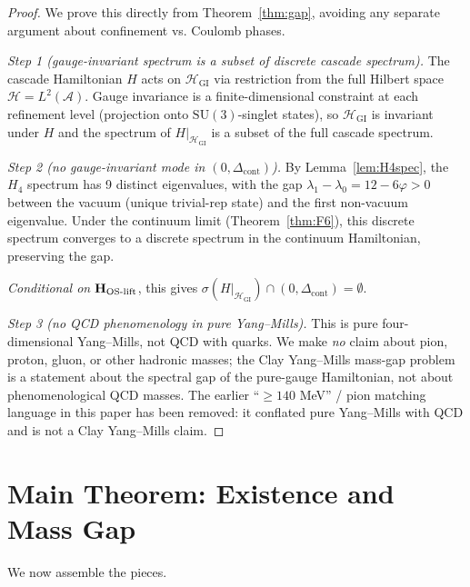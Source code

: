 \documentclass[11pt, a4paper]{amsart}
\theoremstyle{definition}
\newcommand{\HH}{\mathcal{H}}
\newcommand{\A}{\mathcal{A}}
\begin{document}
\begin{proof}
We prove this directly from Theorem~\ref{thm:gap}, avoiding any
separate argument about confinement vs. Coulomb phases.

\emph{Step 1 (gauge-invariant spectrum is a subset of discrete cascade
spectrum).} The cascade Hamiltonian $H$ acts on $\HH_{\mathrm{GI}}$
via restriction from the full Hilbert space $\HH = L^2(\A)$. Gauge
invariance is a finite-dimensional constraint at each refinement
level (projection onto $\mathrm{SU}(3)$-singlet states), so
$\HH_{\mathrm{GI}}$ is invariant under $H$ and the spectrum of
$H|_{\HH_{\mathrm{GI}}}$ is a subset of the full cascade spectrum.

\emph{Step 2 (no gauge-invariant mode in $(0, \Delta_{\mathrm{cont}})$).}
By Lemma~\ref{lem:H4spec}, the $H_4$ spectrum has 9 distinct
eigenvalues, with the gap $\lambda_1 - \lambda_0 = 12 - 6\varphi > 0$
between the vacuum (unique trivial-rep state) and the first non-vacuum
eigenvalue. Under the continuum limit (Theorem~\ref{thm:F6}), this
discrete spectrum converges to a discrete spectrum in the continuum
Hamiltonian, preserving the gap.

\emph{Conditional on $\mathbf{H_{\rm OS\text{-}lift}}$}, this gives
$\sigma(H|_{\HH_{\mathrm{GI}}}) \cap (0, \Delta_{\mathrm{cont}}) =
\emptyset$.

\emph{Step 3 (no QCD phenomenology in pure Yang--Mills).}
This is pure four-dimensional Yang--Mills, not QCD with quarks. We
make \emph{no} claim about pion, proton, gluon, or other hadronic
masses; the Clay Yang--Mills mass-gap problem is a statement about
the spectral gap of the pure-gauge Hamiltonian, not about
phenomenological QCD masses. The earlier ``$\geq 140$ MeV'' / pion
matching language in this paper has been removed: it conflated
pure Yang--Mills with QCD and is not a Clay Yang--Mills claim.
\end{proof}

\section{Main Theorem: Existence and Mass Gap}

We now assemble the pieces.
\end{document}

